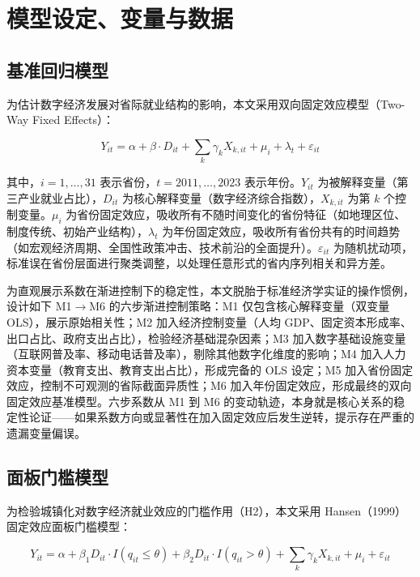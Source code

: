 \section{模型设定、变量与数据}

\subsection{基准回归模型}

为估计数字经济发展对省际就业结构的影响，本文采用双向固定效应模型（Two-Way Fixed Effects）：

\begin{equation}\label{eq:baseline}
Y_{it} = \alpha + \beta \cdot D_{it} + \sum_{k} \gamma_k X_{k,it} + \mu_i + \lambda_t + \varepsilon_{it}
\end{equation}

其中，$i=1,\ldots,31$ 表示省份，$t=2011,\ldots,2023$ 表示年份。$Y_{it}$ 为被解释变量（第三产业就业占比），$D_{it}$ 为核心解释变量（数字经济综合指数），$X_{k,it}$ 为第 $k$ 个控制变量。$\mu_i$ 为省份固定效应，吸收所有不随时间变化的省份特征（如地理区位、制度传统、初始产业结构），$\lambda_t$ 为年份固定效应，吸收所有省份共有的时间趋势（如宏观经济周期、全国性政策冲击、技术前沿的全面提升）。$\varepsilon_{it}$ 为随机扰动项，标准误在省份层面进行聚类调整，以处理任意形式的省内序列相关和异方差。

为直观展示系数在渐进控制下的稳定性，本文脱胎于标准经济学实证的操作惯例，设计如下 M1$\rightarrow$M6 的六步渐进控制策略：M1 仅包含核心解释变量（双变量 OLS），展示原始相关性；M2 加入经济控制变量（人均 GDP、固定资本形成率、出口占比、政府支出占比），检验经济基础混杂因素；M3 加入数字基础设施变量（互联网普及率、移动电话普及率），剔除其他数字化维度的影响；M4 加入人力资本变量（教育支出、教育支出占比），形成完备的 OLS 设定；M5 加入省份固定效应，控制不可观测的省际截面异质性；M6 加入年份固定效应，形成最终的双向固定效应基准模型。六步系数从 M1 到 M6 的变动轨迹，本身就是核心关系的稳定性论证——如果系数方向或显著性在加入固定效应后发生逆转，提示存在严重的遗漏变量偏误。

\subsection{面板门槛模型}

为检验城镇化对数字经济就业效应的门槛作用（H2），本文采用 Hansen（1999）固定效应面板门槛模型：

\begin{equation}\label{eq:threshold}
Y_{it} = \alpha + \beta_1 D_{it} \cdot I(q_{it} \leq \theta) + \beta_2 D_{it} \cdot I(q_{it} > \theta) + \sum_{k} \gamma_k X_{k,it} + \mu_i + \varepsilon_{it}
\end{equation}

